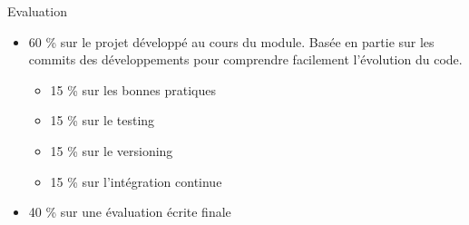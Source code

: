 \documentclass{beamer}
\begin{document}
    \begin{frame}{Evaluation}
        \begin{itemize}
            \item 60 \% sur le projet développé au cours du module.
            Basée en partie sur les commits des développements pour comprendre facilement l'évolution du code.
            \begin{itemize}
                \item 15 \% sur les bonnes pratiques
                \item 15 \% sur le testing
                \item 15 \% sur le versioning
                \item 15 \% sur l'intégration continue
            \end{itemize}
            \item 40 \% sur une évaluation écrite finale
        \end{itemize}
    \end{frame}
\end{document}
